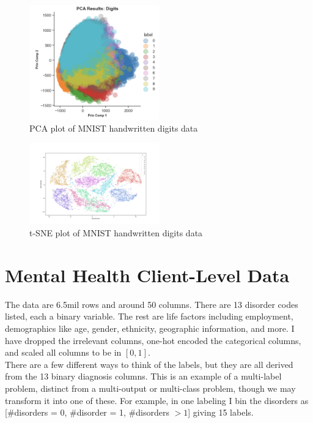 \documentclass[11pt]{amsart}
\begin{document}
\begin{figure}[h]
\caption{PCA plot of MNIST handwritten digits data}
\centering
\includegraphics[width=0.5\textwidth]{PCA_plot_MNIST}
\end{figure}

\begin{figure}[h]
\caption{t-SNE plot of MNIST handwritten digits data}
\centering
\includegraphics[width=0.5\textwidth]{t-SNE_plot_MNIST}
\end{figure}

\section{Mental Health Client-Level Data}

The data are 6.5mil rows and around 50 columns. There are 13 disorder codes listed, each a binary variable. The rest are life factors including employment, demographics like age, gender, ethnicity, geographic information, and more. I have dropped the irrelevant columns, one-hot encoded the categorical columns, and scaled all columns to be in $[0,1]$. \\

There are a few different ways to think of the labels, but they are all derived from the 13 binary diagnosis columns. This is an example of a multi-label problem, distinct from a multi-output or multi-class problem, though we may transform it into one of these. For example, in one labeling I bin the disorders as [\#disorders = 0, \#disorder = 1, \#disorders $> 1$] giving 15 labels. \\
\end{document}
